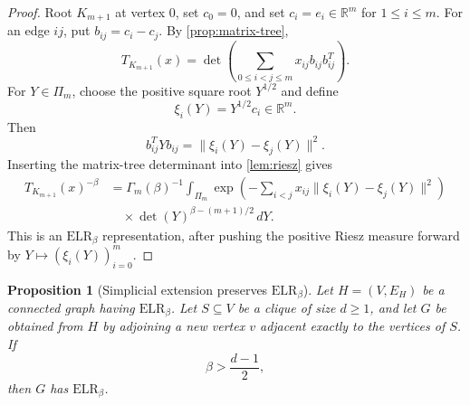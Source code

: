 \documentclass[preprint,12pt,authoryear]{elsarticle}
\numberwithin{equation}{section}
\newtheorem{proposition}[theorem]{Proposition}
\theoremstyle{definition}
\theoremstyle{remark}
\newcommand{\R}{\mathbb{R}}
\newcommand{\1}{\mathbf{1}}
\newcommand{\ELR}{\mathrm{ELR}}
\begin{document}
\begin{proof}
Root \(K_{m+1}\) at vertex \(0\), set \(c_0=0\), and set \(c_i=e_i\in\R^m\) for \(1\le i\le m\).  For an edge \(ij\), put \(b_{ij}=c_i-c_j\).  By \cref{prop:matrix-tree},
\begin{equation}
        T_{K_{m+1}}(x)
        =
        \det\left(\sum_{0\le i<j\le m}x_{ij}b_{ij}b_{ij}^T\right).
\end{equation}
For \(Y\in\Pi_m\), choose the positive square root \(Y^{1/2}\) and define
\begin{equation}
        \xi_i(Y)=Y^{1/2}c_i\in\R^m .
\end{equation}
Then
\begin{equation}
        b_{ij}^TYb_{ij}
        =
        \|\xi_i(Y)-\xi_j(Y)\|^2 .
\end{equation}
Inserting the matrix-tree determinant into \cref{lem:riesz} gives
\begin{equation}
\begin{aligned}
        T_{K_{m+1}}(x)^{-\beta}
        &=
        \Gamma_m(\beta)^{-1}
        \int_{\Pi_m}
        \exp\left(
        -\sum_{i<j}x_{ij}\|\xi_i(Y)-\xi_j(Y)\|^2
        \right)  \\
        &\quad\times
        \det(Y)^{\beta-(m+1)/2}\,dY .
\end{aligned}
\end{equation}
This is an \(\ELR_\beta\) representation, after pushing the positive Riesz measure forward by \(Y\mapsto(\xi_i(Y))_{i=0}^m\).
\end{proof}

\begin{proposition}[Simplicial extension preserves \(\ELR_\beta\)]
\label{prop:simplicial-extension-elr}
Let \(H=(V,E_H)\) be a connected graph having \(\ELR_\beta\).  Let \(S\subseteq V\) be a clique of size \(d\ge1\), and let \(G\) be obtained from \(H\) by adjoining a new vertex \(v\) adjacent exactly to the vertices of \(S\).  If
\begin{equation}
        \beta>\frac{d-1}{2},
\end{equation}
then \(G\) has \(\ELR_\beta\).
\end{proposition}
\end{document}
